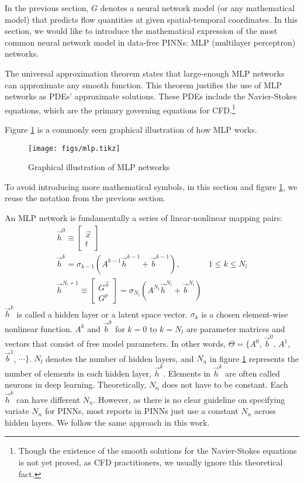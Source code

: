 
In the previous section, $G$ denotes a neural network model (or any mathematical model) that predicts flow quantities at given spatial-temporal coordinates.
In this section, we would like to introduce the mathematical expression of the most common neural network model in data-free PINNs: MLP (multilayer perceptron) networks.

The universal approximation theorem \cite{hornik_approximation_1991} states that large-enough MLP networks can approximate any smooth function.
This theorem justifies the use of MLP networks as PDEs' approximate solutions.
These PDEs include the Navier-Stokes equations, which are the primary governing equations for CFD.\footnote[0]{Though the existence of the smooth solutions for the Navier-Stokes equations is not yet proved, as CFD practitioners, we usually ignore this theoretical fact.}

Figure \ref{fig:mlp-graph} is a commonly seen graphical illustration of how MLP works.
\begin{figure}[hbt!]
    \singlespacing
    \texttt{[image: figs/mlp.tikz]}
    \caption{Graphical illustration of MLP networks}
    \label{fig:mlp-graph}
\end{figure}
To avoid introducing more mathematical symbols, in this section and figure \ref{fig:mlp-graph}, we reuse the notation from the previous section.

An MLP network is fundamentally a series of linear-nonlinear mapping pairs:
\begin{equation}\label{eq:mlp-formula}
    \begin{array}{ll}
        \vec{h}^0 \equiv \begin{bmatrix} \vec{x} \\ t \end{bmatrix} & \\
        \vec{h}^k = \sigma_{k-1}\left(A^{k-1}\vec{h}^{k-1}+\vec{b}^{k-1}\right)\text{,} & 1 \le k \le N_l \\
        \vec{h}^{N_l+1}\equiv \begin{bmatrix} G^{\vec{u}} \\ G^p \end{bmatrix} = \sigma_{N_l}\left(A^{N_l}\vec{h}^{N_l}+\vec{b}^{N_l}\right) &
    \end{array}
\end{equation}
$\vec{h}^k$ is called a hidden layer or a latent space vector.
$\sigma_{k}$ is a chosen element-wise nonlinear function.
$A^{k}$ and $\vec{b}^k$ for $k=0$ to $k=N_l$ are parameter matrices and vectors that consist of free model parameters.
In other words, $\Theta=\{A^0$, $\vec{b}^0$, $A^1$, $\vec{b}^1$, $\cdots\}$.
$N_l$ denotes the number of hidden layers, and $N_n$ in figure \ref{fig:mlp-graph} represents the number of elements in each hidden layer, $\vec{h}^k$.
Elements in $\vec{h}^k$ are often called neurons in deep learning.
Theoretically, $N_n$ does not have to be constant.
Each $\vec{h}^k$ can have different $N_n$.
However, as there is no clear guideline on specifying variate $N_n$ for PINNs, most reports in PINNs just use a constant $N_n$ across hidden layers.
We follow the same approach in this work.

